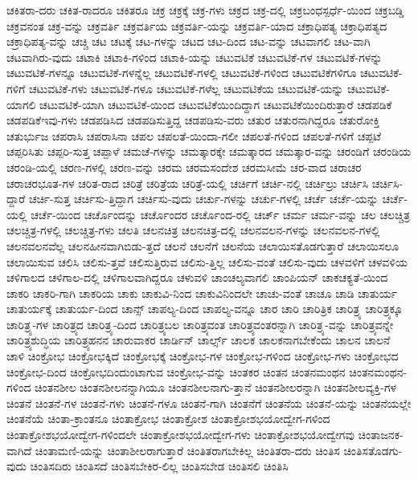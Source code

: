{ಚಕಿತರಾ-ದರು
ಚಕಿತ-ರಾದರೂ
ಚಕಿತರೂ
ಚಕ್ರ
ಚಕ್ರಕ್ಕೆ
ಚಕ್ರ-ಗಳು
ಚಕ್ರದ
ಚಕ್ರ-ದಲ್ಲಿ
ಚಕ್ರಬಂಧಸ್ಪರ್ಧೆ-ಯಿಂದ
ಚಕ್ರಬಡ್ಡಿ
ಚಕ್ರವನಂತ
ಚಕ್ರ-ವನ್ನು
ಚಕ್ರವರ್ತಿ
ಚಕ್ರವರ್ತಿಯ
ಚಕ್ರವರ್ತಿ-ಯನ್ನು
ಚಕ್ರವರ್ತಿ-ಯಾದ
ಚಕ್ರಾಧಿಪತ್ಯ
ಚಕ್ರಾಧಿಪತ್ಯದ
ಚಕ್ರಾಧಿಪತ್ಯ-ವನ್ನು
ಚಚ್ಚಿ
ಚಟ
ಚಟಕ್ಕೆ
ಚಟ-ಗಳನ್ನು
ಚಟದ
ಚಟ-ದಿಂದ
ಚಟ-ವನ್ನು
ಚಟವಾಗಲಿ
ಚಟ-ವಾಗಿ
ಚಟವಾಗಿರು-ವುದು
ಚಟಾಕಿ
ಚಟಾಕಿ-ಗಳಿಂದ
ಚಟಾಕಿ-ಯನ್ನು
ಚಟುವಟಿಕೆ
ಚಟುವಟಿಕೆ-ಗಳ
ಚಟುವಟಿಕೆ-ಗಳನ್ನು
ಚಟುವಟಿಕೆ-ಗಳನ್ನೂ
ಚಟುವಟಿಕೆ-ಗಳನ್ನೆಲ್ಲ
ಚಟುವಟಿಕೆ-ಗಳಲ್ಲಿ
ಚಟುವಟಿಕೆ-ಗಳಿಂದ
ಚಟುವಟಿಕೆಗಳಿಗೂ
ಚಟುವಟಿಕೆ-ಗಳಿಗೆ
ಚಟುವಟಿಕೆ-ಗಳು
ಚಟುವಟಿಕೆ-ಗಳೂ
ಚಟುವಟಿಕೆ-ಗಳೆಲ್ಲ
ಚಟುವಟಿಕೆಯ
ಚಟುವಟಿಕೆ-ಯನ್ನು
ಚಟುವಟಿಕೆ-ಯಾಗಲಿ
ಚಟುವಟಿಕೆ-ಯಾಗಿ
ಚಟುವಟಿಕೆ-ಯಿಂದ
ಚಟುವಟಿಕೆಯಿಂದಿದ್ದಾಗ
ಚಟುವಟಿಕೆಯಿಂದಿರುತ್ತಾರೆ
ಚಡಪಡಿಕೆ
ಚಡಪಡಿಕೆಇವು-ಗಳು
ಚಡಪಡಿಸಿದ
ಚಡಪಡಿಸುತ್ತಿದ್ದ
ಚಡಪಡಿಸು-ವರು
ಚತುರ
ಚತುರನಾಗಿದ್ದರೂ
ಚತುರೋಕ್ತಿ
ಚತುರ್ಭುಜ
ಚಪರಾಸಿ
ಚಪರಾಸಿನಾ
ಚಪಲ
ಚಪಲತೆ-ಯಿಂದಾ-ಗಲೀ
ಚಪಲತೆ-ಗಳಿಂದ
ಚಪಲತೆ-ಗಳಿಗೆ
ಚಪ್ಪಟೆ
ಚಪ್ಪರಿಸಿತು
ಚಪ್ಪರಿ-ಸುತ್ತ
ಚಪ್ಪಾಳೆ
ಚಮಚೆ-ಗಳನ್ನು
ಚಮತ್ಕಾರಕ್ಕೇ
ಚಮತ್ಕಾರದ
ಚಮತ್ಕಾರ-ವನ್ನು
ಚರಂಡಿಗೆ
ಚರಂಡಿಯ
ಚರಂಡಿ-ಯಲ್ಲಿ
ಚರಣ-ಗಳಲ್ಲಿ
ಚರಣ-ವನ್ನು
ಚರಮ
ಚರಮಸಂದೇಶ
ಚರಮಸೀಮೆ
ಚರ-ವಾದ
ಚರಾಚರ
ಚರಾಚರಭೂತ-ಗಳ
ಚರಿತ-ರಾದ
ಚರಿತ್ರೆ
ಚರಿತ್ರೆಯ
ಚರಿತ್ರೆ-ಯಲ್ಲಿ
ಚರ್ಚಿಗೆ
ಚರ್ಚಿ-ನಲ್ಲಿ
ಚರ್ಚಿಲ್ರು
ಚರ್ಚಿಸಿ
ಚರ್ಚಿಸಿ-ದ್ದಾರೆ
ಚರ್ಚಿ-ಸುತ್ತ
ಚರ್ಚಿಸು-ತ್ತಿದ್ದಾಗ
ಚರ್ಚಿಸು-ವುದು
ಚರ್ಚು-ಗಳನ್ನು
ಚರ್ಚು-ಗಳಲ್ಲಿ
ಚರ್ಚೆ
ಚರ್ಚೆ-ಯನ್ನು
ಚರ್ಚೆ-ಯಲ್ಲಿ
ಚರ್ಚೆ-ಯಿಂದ
ಚರ್ಚೊಂದನ್ನು
ಚರ್ಚೊಂದರ
ಚರ್ಚೊಂದ-ರಲ್ಲಿ
ಚರ್ಚ್
ಚರ್ಮ
ಚರ್ಮ-ವನ್ನು
ಚಲ
ಚಲಚ್ಚಿತ್ರ
ಚಲಚ್ಚಿತ್ರ-ಗಳಲ್ಲಿ
ಚಲಚ್ಚಿತ್ರ-ಗಳು
ಚಲತಿ
ಚಲನಚಿತ್ರ
ಚಲನಚಿತ್ರ-ದಲ್ಲಿ
ಚಲನವಲನ-ಗಳನ್ನು
ಚಲನವಲನ-ಗಳಲ್ಲಿ
ಚಲನವಲನವೆಲ್ಲ
ಚಲನಹೀನವಾಗಿಬಿಡು-ತ್ತದೆ
ಚಲನೆ
ಚಲನೆಗೆ
ಚಲನೆಯ
ಚಲಾಯಿಸತೊಡಗುತ್ತಾರೆ
ಚಲಾಯಿಸಲೂ
ಚಲಾಯಿಸುವ
ಚಲಿಸಿ
ಚಲಿಸು-ತ್ತವೆ
ಚಲಿಸುತ್ತಿರುವ
ಚಲಿಸು-ತ್ತಿಲ್ಲ
ಚಲಿಸು-ವಂತೆ
ಚಲಿಸು-ವುದು
ಚಳವಳಿಗೆ
ಚಳವಳಿಯ
ಚಳಿಗಾಲದ
ಚಳಿಗಾಲ-ದಲ್ಲಿ
ಚಳಿಗಾಲವಾಗಿದ್ದರೂ
ಚಳುವಳಿ
ಚಾಂಚಲ್ಯವಾಗಲಿ
ಚಾಂಪಿಯನ್
ಚಾಕಚಕ್ಯತೆ-ಯಿಂದ
ಚಾಕರಿ
ಚಾಕರಿ-ಗಾಗಿ
ಚಾಕರಿಯ
ಚಾಕು
ಚಾಕುವಿ-ನಿಂದ
ಚಾಕುವಿನಿಂದಲೇ
ಚಾಚು-ವಂತೆ
ಚಾಚೂ
ಚಾಡಿ
ಚಾತುರ್ಯ
ಚಾತುರ್ಯಕ್ಕೆ
ಚಾತುರ್ಯ-ದಿಂದ
ಚಾನ್ಸ್
ಚಾಪಲ್ಯ-ದಿಂದ
ಚಾಪಲ್ಯ-ವನ್ನೂ
ಚಾರ
ಚಾರಿ
ಚಾರಿತ್ರಿಕ
ಚಾರಿತ್ರ್ಯ
ಚಾರಿತ್ರ್ಯಕ್ಕೂ
ಚಾರಿತ್ರ್ಯ-ಗಳ
ಚಾರಿತ್ರ್ಯದ
ಚಾರಿತ್ರ್ಯ-ದಿಂದ
ಚಾರಿತ್ರ್ಯಬಲ
ಚಾರಿತ್ರ್ಯವಂತ
ಚಾರಿತ್ರ್ಯವಂತರನ್ನಾಗಿ
ಚಾರಿತ್ರ್ಯ-ವನ್ನು
ಚಾರಿತ್ರ್ಯವನ್ನೇ
ಚಾರಿತ್ರ್ಯಶುದ್ಧಿಯ
ಚಾರಿತ್ರ್ಯಹನನ
ಚಾರುವಾಕರ
ಚಾರ್ಡಿನ್
ಚಾರ್ಲ್ಸ್
ಚಾಲಕ
ಚಾಲಕನಾಗಬೇಕೆಂದು
ಚಾಲನ
ಚಾಲನೆ
ಚಾಳಿ
ಚಿಂಕ್ರೋಭ
ಚಿಂಕ್ರೋಭಕ್ಕಿದೆ
ಚಿಂಕ್ರೋಭಕ್ಕೆ
ಚಿಂಕ್ರೋಭ-ಗಳ
ಚಿಂಕ್ರೋಭ-ಗಳಿಂದ
ಚಿಂಕ್ರೋಭ-ಗಳು
ಚಿಂಕ್ರೋಭದ
ಚಿಂಕ್ರೋಭ-ದಿಂದ
ಚಿಂಕ್ರೋಭದಿಂದುಂಟಾಗುವ
ಚಿಂಕ್ರೋಭ-ವನ್ನು
ಚಿಂತಕರ
ಚಿಂತನ
ಚಿಂತನಮಂಥನ
ಚಿಂತನಮಂಥನ-ಗಳಿಂದ
ಚಿಂತನಶೀಲ
ಚಿಂತನಶೀಲನನ್ನಾಗಿಯೂ
ಚಿಂತನಶೀಲನಾಗು-ತ್ತಾನೆ
ಚಿಂತನಶೀಲರನ್ನಾಗಿ
ಚಿಂತನಶೀಲವ್ಯಕ್ತಿ-ಗಳ
ಚಿಂತನೆ
ಚಿಂತನೆ-ಗಳ
ಚಿಂತನೆ-ಗಳು
ಚಿಂತನೆ-ಗಳೂ
ಚಿಂತನೆ-ಗಾಗಿ
ಚಿಂತನೆಗೆ
ಚಿಂತನೆಯ
ಚಿಂತನೆ-ಯನ್ನು
ಚಿಂತನೆಯಲ್ಲೇ
ಚಿಂತನೆಯೆ
ಚಿಂತಾ-ಕ್ರಾಂತನೂ
ಚಿಂತಾಕ್ರೋಭ
ಚಿಂತಾಕ್ರೋಶ
ಚಿಂತಾಕ್ರೋಶಭಯೋದ್ವೇಗ-ಗಳಿಂದ
ಚಿಂತಾಕ್ರೋಶಭಯೋದ್ವೇಗ-ಗಳಿಂದಲೇ
ಚಿಂತಾಕ್ರೋಶಭಯೋದ್ವೇಗ-ಗಳು
ಚಿಂತಾಕ್ರೋಶಭಯೋದ್ವೇಗವು
ಚಿಂತಾಜನಕ-ವಾಗಿದೆ
ಚಿಂತಾಮಣಿ-ಯನ್ನು
ಚಿಂತಾಶೀಲರಾಗುತ್ತಾರೆ
ಚಿಂತಿತರಾಗಬೇಕಿಲ್ಲ
ಚಿಂತಿತರಾ-ದರು
ಚಿಂತಿಸ
ಚಿಂತಿಸತೊಡಗು-ವುದು
ಚಿಂತಿಸದಿರು
ಚಿಂತಿಸದೆ
ಚಿಂತಿಸಬೇಕಿರ-ಲಿಲ್ಲ
ಚಿಂತಿಸಬೇಡ
ಚಿಂತಿಸಲಿ
ಚಿಂತಿಸಿ
}
